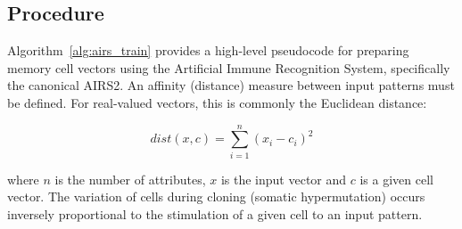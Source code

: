 \subsection{Procedure}
Algorithm~\ref{alg:airs_train} provides a high-level pseudocode for preparing memory cell vectors using the Artificial Immune Recognition System, specifically the canonical AIRS2.
An affinity (distance) measure between input patterns must be defined. For real-valued vectors, this is commonly the Euclidean distance:

\begin{equation}
	dist(x,c) = \sum_{i=1}^{n} (x_i - c_i)^2
\end{equation}

where $n$ is the number of attributes, $x$ is the input vector and $c$ is a given cell vector. The variation of cells during cloning (somatic hypermutation) occurs inversely proportional to the stimulation of a given cell to an input pattern.

